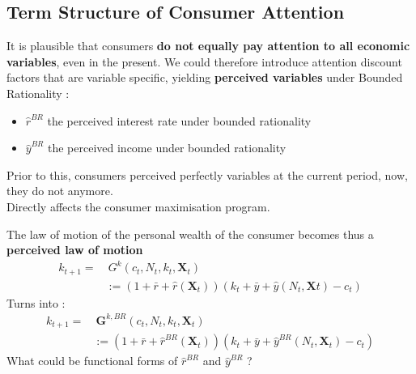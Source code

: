 \documentclass{beamer}
\begin{document}
\subsection{Term Structure of Consumer Attention}
\begin{frame}{\subsecname}
    It is plausible that consumers \textbf{do not equally pay attention to all economic variables}, even in the present. 
    We could therefore introduce attention discount factors that are variable specific, yielding \textbf{perceived variables} under Bounded Rationality : 
    \begin{itemize}
        \item $\hat{r}^{BR}$ the perceived interest rate under bounded rationality
        \item $\hat{y}^{BR}$ the perceived income under bounded rationality
    \end{itemize}
    Prior to this, consumers perceived perfectly variables at the current period, now, they do not anymore. \\
    \hfill \linebreak
    Directly affects the consumer maximisation program. 
\end{frame}
    
\begin{frame}{\subsecname}
    The law of motion of the personal wealth of the consumer becomes thus a \textbf{perceived law of motion}
    \begin{equation}\tag{6}
        \begin{split}
            k_{t+1}= &\ G^{k}(c_{t},N_{t}, k_{t}, \bm{X}_{t}) \\ 
            & := (1+\bar{r}+\hat{r}(\bm{X}_{t}))(k_{t}+\bar{y}+\hat{y}(N_{t},\bm{X}t)-c_{t})
        \end{split}
    \end{equation}
    Turns into :    
    \begin{equation} \tag{49}
        \begin{split}
            k_{t+1}= &\  \textbf{G}^{k,BR}(c_{t},N_{t},k_{t},\textbf{X}_{t}) \\
            & := (1+\bar{r}+\hat{r}^{BR}(\textbf{X}_t))(k_{t}+\bar{y}+\hat{y}^{BR}(N_{t},\textbf{X}_t)-c_{t})
        \end{split}
    \end{equation}
    \hfill \linebreak
    What could be functional forms of $\hat{r}^{BR}$ and $\hat{y}^{BR}$ ?
\end{frame}
\end{document}
